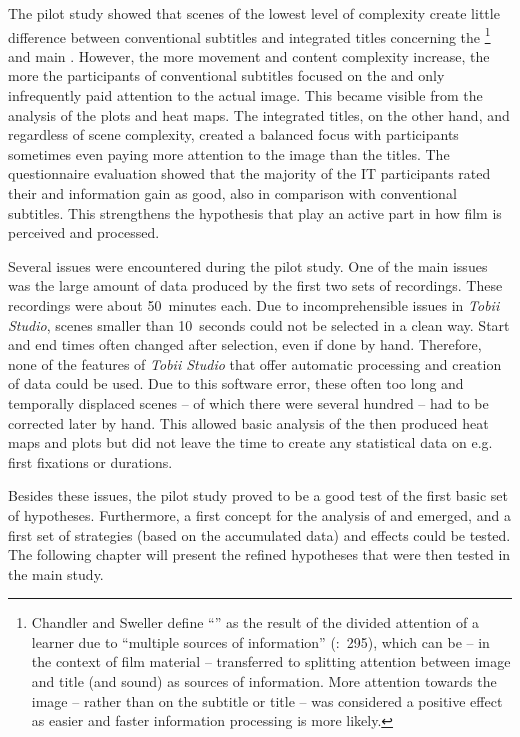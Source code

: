 The pilot study showed that scenes of the lowest level of complexity create little difference between conventional subtitles and integrated titles concerning the \footnote{Chandler and Sweller define “” as the result of the divided attention of a learner due to “multiple sources of information” (\citeyear{Chandler1991}:~295), which can be – in the context of film material – transferred to splitting attention between image and title (and sound) as sources of information. More attention towards the image – rather than on the subtitle or title – was considered a positive effect as easier and faster information processing is more likely.} and main . However, the more movement and content complexity increase, the more the participants of conventional subtitles focused on the  and only infrequently paid attention to the actual image. This became visible from the analysis of the  plots and heat maps. The integrated titles, on the other hand, and regardless of scene complexity, created a balanced focus with participants sometimes even paying more attention to the image than the titles. The questionnaire evaluation showed that the majority of the IT participants rated their  and information gain as good, also in comparison with conventional subtitles. This strengthens the hypothesis that  play an active part in how film is perceived and processed.

Several issues were encountered during the pilot study. One of the main issues was the large amount of data produced by the first two sets of recordings. These recordings were about 50~minutes each. Due to incomprehensible issues in \textit{Tobii Studio}, scenes smaller than 10~seconds could not be selected in a clean way. Start and end times often changed after selection, even if done by hand. Therefore, none of the features of \textit{Tobii Studio} that offer automatic processing and creation of data could be used. Due to this software error, these often too long and temporally displaced scenes – of which there were several hundred – had to be corrected later by hand. This allowed basic analysis of the then produced heat maps and  plots but did not leave the time to create any statistical data on e.g. first fixations or  durations.

Besides these issues, the pilot study proved to be a good test of the first basic set of hypotheses. Furthermore, a first concept for the analysis of  and  emerged, and a first set of  strategies (based on the accumulated  data) and effects could be tested. The following chapter will present the refined hypotheses that were then tested in the main study.

